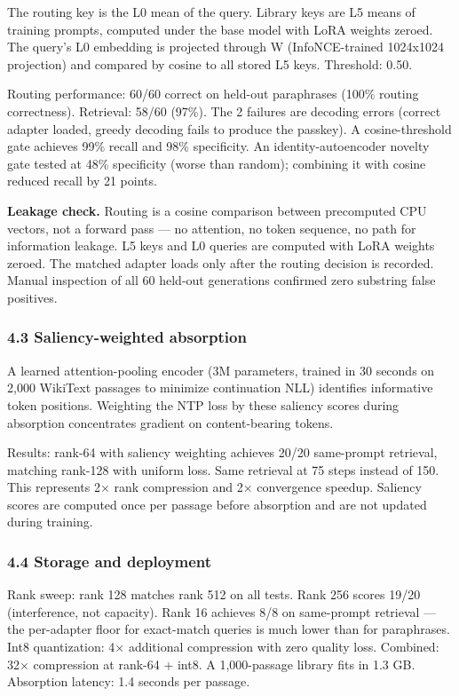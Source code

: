 The routing key is the L0 mean of the query. Library keys are L5 means of training prompts, computed under the base model with LoRA weights zeroed. The query's L0 embedding is projected through W (InfoNCE-trained 1024x1024 projection) and compared by cosine to all stored L5 keys. Threshold: 0.50.

Routing performance: 60/60 correct on held-out paraphrases (100\% routing correctness). Retrieval: 58/60 (97\%). The 2 failures are decoding errors (correct adapter loaded, greedy decoding fails to produce the passkey). A cosine-threshold gate achieves 99\% recall and 98\% specificity. An identity-autoencoder novelty gate tested at 48\% specificity (worse than random); combining it with cosine reduced recall by 21 points.

\textbf{Leakage check.} Routing is a cosine comparison between precomputed CPU vectors, not a forward pass --- no attention, no token sequence, no path for information leakage. L5 keys and L0 queries are computed with LoRA weights zeroed. The matched adapter loads only after the routing decision is recorded. Manual inspection of all 60 held-out generations confirmed zero substring false positives.

\subsubsection{4.3 Saliency-weighted absorption}\label{saliency-weighted-absorption}

A learned attention-pooling encoder (3M parameters, trained in 30 seconds on 2,000 WikiText passages to minimize continuation NLL) identifies informative token positions. Weighting the NTP loss by these saliency scores during absorption concentrates gradient on content-bearing tokens.

Results: rank-64 with saliency weighting achieves 20/20 same-prompt retrieval, matching rank-128 with uniform loss. Same retrieval at 75 steps instead of 150. This represents 2× rank compression and 2× convergence speedup. Saliency scores are computed once per passage before absorption and are not updated during training.

\subsubsection{4.4 Storage and deployment}\label{storage-and-deployment}

Rank sweep: rank 128 matches rank 512 on all tests. Rank 256 scores 19/20 (interference, not capacity). Rank 16 achieves 8/8 on same-prompt retrieval --- the per-adapter floor for exact-match queries is much lower than for paraphrases. Int8 quantization: 4× additional compression with zero quality loss. Combined: 32× compression at rank-64 + int8. A 1,000-passage library fits in 1.3 GB. Absorption latency: 1.4 seconds per passage.

